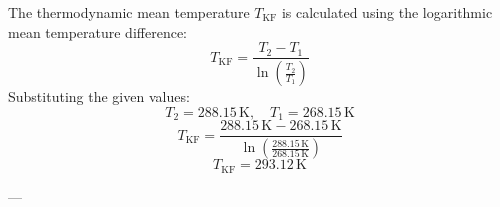 The thermodynamic mean temperature \( T_{\text{KF}} \) is calculated using the logarithmic mean temperature difference:  
\[
T_{\text{KF}} = \frac{T_2 - T_1}{\ln \left( \frac{T_2}{T_1} \right)}
\]  
Substituting the given values:  
\[
T_2 = 288.15 \, \text{K}, \quad T_1 = 268.15 \, \text{K}
\]  
\[
T_{\text{KF}} = \frac{288.15 \, \text{K} - 268.15 \, \text{K}}{\ln \left( \frac{288.15 \, \text{K}}{268.15 \, \text{K}} \right)}
\]  
\[
T_{\text{KF}} = 293.12 \, \text{K}
\]  

---